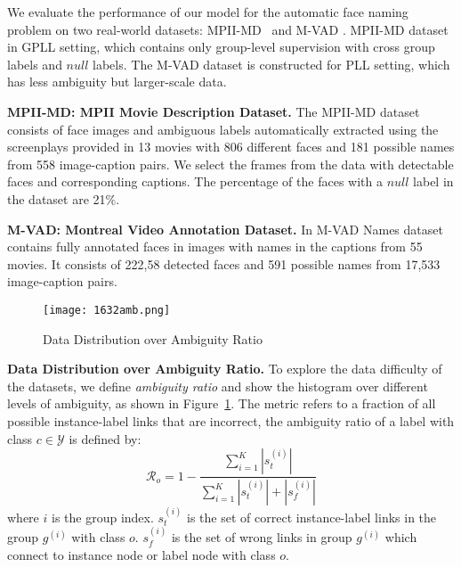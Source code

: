 \documentclass[letterpaper]{article} \usepackage{aaai20}  \usepackage{times}  \usepackage{helvet} \usepackage{courier}  \usepackage[hyphens]{url}  \usepackage{graphicx} \urlstyle{rm} \def\UrlFont{\rm}  \frenchspacing  \setlength{\pdfpagewidth}{8.5in}  \setlength{\pdfpageheight}{11in}  \frenchspacing
\begin{document}
We evaluate the performance of our model for the automatic face naming problem on two real-world datasets: MPII-MD~\cite{RohrbachCVPR2017} and M-VAD \cite{pini2019mvad}. MPII-MD dataset in GPLL setting, which contains only group-level supervision with cross group labels and $null$ labels. The M-VAD dataset is constructed for PLL setting, which has less ambiguity but larger-scale data.







\noindent\textbf{MPII-MD: MPII Movie Description Dataset.}
The MPII-MD dataset consists of face images and ambiguous labels automatically extracted using the screenplays provided in 13 movies with 806 different faces and 181 possible names from 558 image-caption pairs. We select the frames from the data with detectable faces and corresponding captions. The percentage of the faces with a $null$ label in the dataset are 21\%. 


\noindent\textbf{M-VAD: Montreal Video Annotation Dataset.}
In M-VAD Names dataset contains fully annotated faces in images with names in the captions from 55 movies. It consists of 222,58 detected faces and 591 possible names from 17,533 image-caption pairs. 


\begin{figure}[!th]
  \texttt{[image: 1632amb.png]}
\caption{Data Distribution over Ambiguity Ratio}
  \label{fig:dataratio}
\end{figure}

\noindent\textbf{Data Distribution over Ambiguity Ratio.}
To explore the data difficulty of the datasets, we define \textit{ambiguity ratio} and show the histogram over different levels of ambiguity, as shown in Figure~\ref{fig:dataratio}. The metric refers to a fraction of all possible instance-label links that are incorrect, the ambiguity ratio of a label with class $c \in \mathcal{Y}$ is defined by:
\begin{equation}
\mathcal{R}_o =  1- \frac{ \sum_{i=1}^{K} |s^{(i)}_t|}{\sum_{i=1}^{K} |s^{(i)}_t| + |s^{(i)}_f|}
\end{equation}
where $i$ is the group index. $s_t^{(i)}$ is the set of correct instance-label links in the group $g^{(i)}$ with class $o$. $s_f^{(i)}$ is the set of wrong links in group $g^{(i)}$ which connect to instance node or label node with class $o$. 
\end{document}
